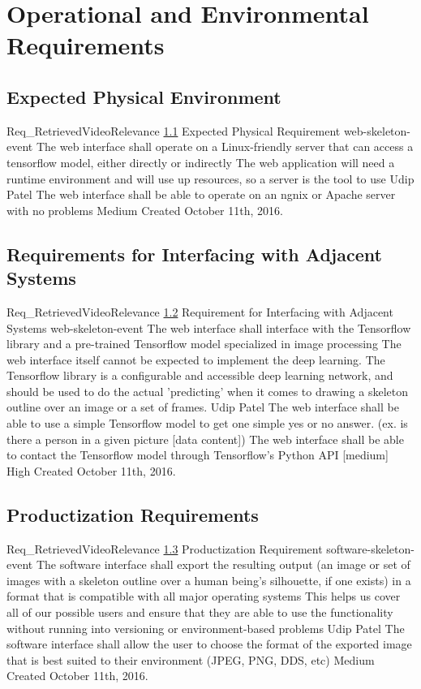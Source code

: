 \documentclass{scrreprt}
\begin{document}
\section{Operational and Environmental Requirements}

\subsection{Expected Physical Environment}
\label{req-op-env}

\requirement
{Req_RetrievedVideoRelevance}
{\ref{req-op-env} Expected Physical Requirement}
{web-skeleton-event}
{The web interface shall operate on a Linux-friendly server that can access a tensorflow model, either directly or indirectly}
{The web application will need a runtime environment and will use up resources, so a server is the tool to use }
{Udip Patel}
{The web interface shall be able to operate on an ngnix or Apache server with no problems}
{Medium}
{Created October 11th, 2016.}


\subsection{Requirements for Interfacing with Adjacent Systems}
\label{req-interfacing}

\requirement
{Req_RetrievedVideoRelevance}
{\ref{req-interfacing} Requirement for Interfacing with Adjacent Systems}
{web-skeleton-event}
{The web interface shall interface with the Tensorflow library and a pre-trained Tensorflow model specialized in image processing}
{The web interface itself cannot be expected to implement the deep learning. The Tensorflow library is a configurable and accessible deep learning network, and should be used to do the actual 'predicting' when it comes to drawing a skeleton outline over an image or a set of frames.}
{Udip Patel}
{The web interface shall be able to use a simple Tensorflow model to get one simple yes or no answer. (ex. is there a person in a given picture [data content]) The web interface shall be able to contact the Tensorflow model through Tensorflow's Python API [medium]}
{High}
{Created October 11th, 2016.}



\subsection{Productization Requirements}
\label{req-product}

\requirement
{Req_RetrievedVideoRelevance}
{\ref{req-product} Productization Requirement}
{software-skeleton-event}
{The software interface shall export the resulting output (an image or set of images with a skeleton outline over a human being's silhouette, if one exists) in a format that is compatible with all major operating systems }
{This helps us cover all of our possible users and ensure that they are able to use the functionality without running into versioning or environment-based problems}
{Udip Patel}
{The software interface shall allow the user to choose the format of the exported image that is best suited to their environment (JPEG, PNG, DDS, etc) }
{Medium}
{Created October 11th, 2016.}
\end{document}
